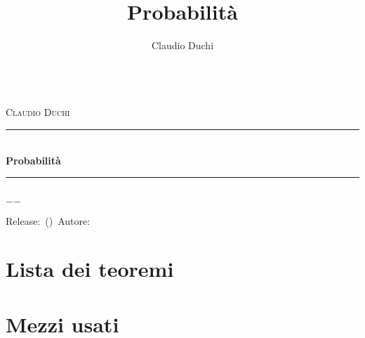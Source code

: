 \documentclass[a4paper,oneside]{book}%
\title{Probabilità}
\author{Claudio Duchi}
\date{\datetime}
\makeatletter
\theoremstyle{marginbreak}
\theoremstyle{marginbreak}
\theoremstyle{changebreak}
\theoremstyle{change}
\theoremstyle{change}
\theoremstyle{plain}
\theoremstyle{marginbreak}
\theoremstyle{plain}
\theoremstyle{plain}
\theoremstyle{nonumberplain}
\renewcommand\frontmatter{%
 	\cleardoublepage
 	\@mainmatterfalse
 }
\renewcommand\mainmatter{%
 	\cleardoublepage
 	\@mainmattertrue
 }
\newcommand{\HRule}{\rule{\linewidth}{0.5mm}}
\makeatother
\begin{document}
\frontmatter
\begin{titlepage}
\begin{center}	
	\Lgrandedue\\[1cm]    
	\textsc{\LARGE Claudio Duchi}\\[1.4cm]
	\HRule \\[0.4cm]
{ \huge \bfseries Probabilità}\\[0.4cm]
\HRule \\
\vfill
		{\large $-$\DTMnow$-$}	
\end{center}
{\centering
Release:\gitReln\ (\gitAbbrevHash)\ Autore:\gitAuthorName\ 
\gitCommitterDate \\
}
\end{titlepage}	
	\hypersetup{pageanchor=true}
		\CDcopyright
		\tableofcontents
		\chapter*{Lista dei teoremi}
		\listoffigures
		\listoftables
			\mainmatter
	
  \glsaddall	
\printglossaries
\backmatter	
 \appendix
\nocite{*}
\printbibliography
 \printindex



 \chapter{Mezzi usati}
 \CDMezziUsati
\end{document}
